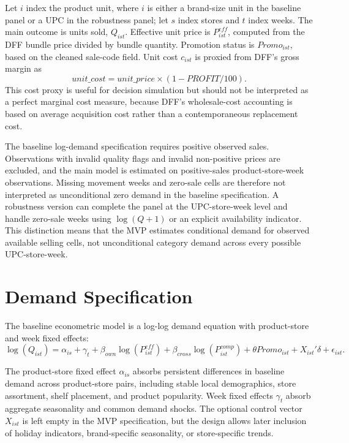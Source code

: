 \documentclass[11pt]{article}
\begin{document}
Let $i$ index the product unit, where $i$ is either a brand-size unit in the baseline panel or a UPC in the robustness panel; let $s$ index stores and $t$ index weeks. The main outcome is units sold, $Q_{ist}$. Effective unit price is $P^{eff}_{ist}$, computed from the DFF bundle price divided by bundle quantity. Promotion status is $Promo_{ist}$, based on the cleaned sale-code field. Unit cost $c_{ist}$ is proxied from DFF's gross margin as
\begin{equation}
unit\_cost = unit\_price \times (1-PROFIT/100).
\end{equation}
This cost proxy is useful for decision simulation but should not be interpreted as a perfect marginal cost measure, because DFF's wholesale-cost accounting is based on average acquisition cost rather than a contemporaneous replacement cost.

The baseline log-demand specification requires positive observed sales. Observations with invalid quality flags and invalid non-positive prices are excluded, and the main model is estimated on positive-sales product-store-week observations. Missing movement weeks and zero-sale cells are therefore not interpreted as unconditional zero demand in the baseline specification. A robustness version can complete the panel at the UPC-store-week level and handle zero-sale weeks using $\log(Q+1)$ or an explicit availability indicator. This distinction means that the MVP estimates conditional demand for observed available selling cells, not unconditional category demand across every possible UPC-store-week.

\section{Demand Specification}

The baseline econometric model is a log-log demand equation with product-store and week fixed effects:
\begin{equation}
\log(Q_{ist})=
\alpha_{is}
+ \gamma_t
+ \beta_{own}\log(P^{eff}_{ist})
+ \beta_{cross}\log(P^{comp}_{ist})
+ \theta Promo_{ist}
+ X_{ist}'\delta
+ \epsilon_{ist}.
\label{eq:demand}
\end{equation}

The product-store fixed effect $\alpha_{is}$ absorbs persistent differences in baseline demand across product-store pairs, including stable local demographics, store assortment, shelf placement, and product popularity. Week fixed effects $\gamma_t$ absorb aggregate seasonality and common demand shocks. The optional control vector $X_{ist}$ is left empty in the MVP specification, but the design allows later inclusion of holiday indicators, brand-specific seasonality, or store-specific trends.
\end{document}
